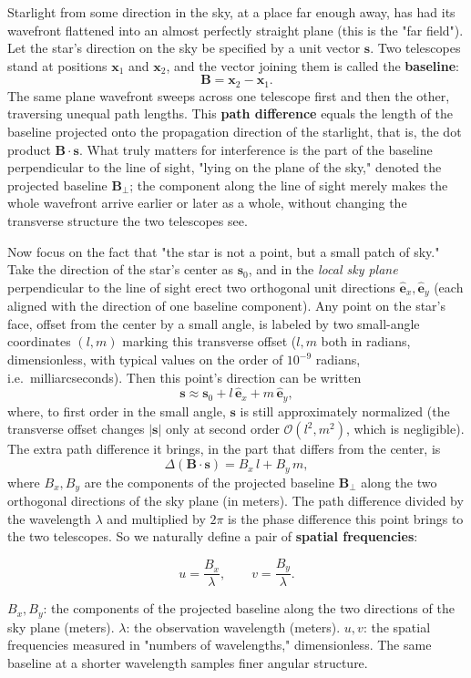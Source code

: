 Starlight from some direction in the sky, at a place far enough away, has had its wavefront flattened into an almost perfectly straight plane (this is the "far field"). Let the star's direction on the sky be specified by a unit vector \(\bm s\). Two telescopes stand at positions \(\bm x_1\) and \(\bm x_2\), and the vector joining them is called the \textbf{baseline}:
\[
  \bm B=\bm x_2-\bm x_1 .
\]
The same plane wavefront sweeps across one telescope first and then the other, traversing unequal path lengths. This \textbf{path difference} equals the length of the baseline projected onto the propagation direction of the starlight, that is, the dot product \(\bm B\cdot\bm s\). What truly matters for interference is the part of the baseline perpendicular to the line of sight, "lying on the plane of the sky," denoted the projected baseline \(\bm B_\perp\); the component along the line of sight merely makes the whole wavefront arrive earlier or later as a whole, without changing the transverse structure the two telescopes see.

Now focus on the fact that "the star is not a point, but a small patch of sky." Take the direction of the star's center as \(\bm s_0\), and in the \emph{local sky plane} perpendicular to the line of sight erect two orthogonal unit directions \(\hat{\bm e}_x,\hat{\bm e}_y\) (each aligned with the direction of one baseline component). Any point on the star's face, offset from the center by a small angle, is labeled by two small-angle coordinates \((l,m)\) marking this transverse offset (\(l,m\) both in radians, dimensionless, with typical values on the order of \(10^{-9}\) radians, i.e.\ milliarcseconds). Then this point's direction can be written
\[
  \bm s\approx\bm s_0+l\,\hat{\bm e}_x+m\,\hat{\bm e}_y ,
\]
where, to first order in the small angle, \(\bm s\) is still approximately normalized (the transverse offset changes \(|\bm s|\) only at second order \(\mathcal O(l^2,m^2)\), which is negligible). The extra path difference it brings, in the part that differs from the center, is
\[
  \Delta(\bm B\cdot\bm s)=B_x\,l+B_y\,m ,
\]
where \(B_x,B_y\) are the components of the projected baseline \(\bm B_\perp\) along the two orthogonal directions of the sky plane (in meters). The path difference divided by the wavelength \(\lambda\) and multiplied by \(2\pi\) is the phase difference this point brings to the two telescopes. So we naturally define a pair of \textbf{spatial frequencies}:

\begin{equation}
  u=\frac{B_x}{\lambda},\qquad v=\frac{B_y}{\lambda}.
  \label{eq:e10-uv}
\end{equation}
\begin{formulaexplain}
\(B_x,B_y\): the components of the projected baseline along the two directions of the sky plane (meters). \(\lambda\): the observation wavelength (meters). \(u,v\): the spatial frequencies measured in "numbers of wavelengths," dimensionless. The same baseline at a shorter wavelength samples finer angular structure.
\end{formulaexplain}

